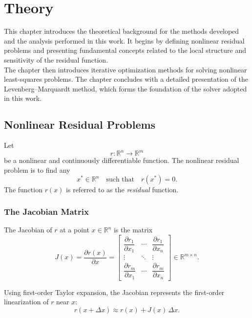 \chapter{Theory}
\label{chap:theory}

This chapter introduces the theoretical background for the methods developed and the analysis performed in this work. It begins by defining nonlinear residual problems and presenting fundamental concepts related to the local structure and sensitivity of the residual function.\\

The chapter then introduces iterative optimization methods for solving nonlinear least-squares problems. The chapter concludes with a detailed presentation of the Levenberg--Marquardt method, which forms the foundation of the solver adopted in this work.

\section{Nonlinear Residual Problems}

Let 
\[
r : \mathbb{R}^n \to \mathbb{R}^m
\]
be a nonlinear and continuously differentiable function. The nonlinear residual problem is to find any
\begin{equation*}
     x^\ast \in \mathbb{R}^n \quad \text{such that} \quad r(x^*) = 0.
\end{equation*}
The function $r(x)$ is referred to as the \emph{residual} function.

\subsection{The Jacobian Matrix}

The Jacobian of \(r\) at a point \(x \in \mathbb{R}^n\) is the matrix
\[
J(x) = \frac{\partial r(x)}{\partial x}
=
\begin{bmatrix}
\dfrac{\partial r_1}{\partial x_1} & \cdots & \dfrac{\partial r_1}{\partial x_n} \\
\vdots & \ddots & \vdots \\
\dfrac{\partial r_m}{\partial x_1} & \cdots & \dfrac{\partial r_m}{\partial x_n}
\end{bmatrix}
\in \mathbb{R}^{m \times n}.
\]

Using first-order Taylor expansion, the Jacobian represents the first-order linearization of \(r\) near \(x\):
\begin{equation}
\label{eq:jac_res_approx}    
r(x + \Delta x) \approx r(x) + J(x)\,\Delta x.
\end{equation}

